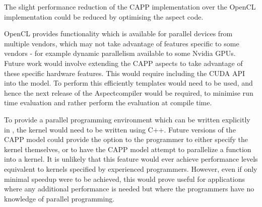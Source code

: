 \documentclass{sig-alternate-05-2015}
\begin{document}
The slight performance reduction of the CAPP implementation over the
OpenCL implementation could be reduced by optimising the aspect code.

OpenCL provides functionality which is available for parallel devices from
multiple vendors, which may not take advantage of features specific to some
vendors - for example dynamic parallelism available to some Nvidia GPUs.
Future work would involve extending the CAPP aspects to take advantage
of these specific hardware features. This would require including the CUDA API
into the model. To perform this efficiently templates would need to be used, and
hence the next release of the Aspect\CPP compiler would be required, to
minimise run time evaluation and rather perform the evaluation at compile time.

To provide a parallel programming environment which can be written explicitly in
\CPP, the kernel would need to be written using C++. Future versions of the
CAPP model could provide the option to the programmer to either specify
the kernel themselves, or to have the CAPP model attempt to
parallelize a \CPP function into a kernel. It is unlikely that this feature would
ever achieve performance levels equivalent to kernels specified by experienced
programmers. However, even if only minimal speedup were to be achieved, this would prove 
useful for applications where any additional performance is needed but where the
programmers have no knowledge of parallel programming. 

%

%
%
\end{document}
